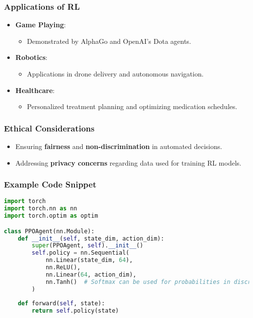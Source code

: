 \documentclass[aspectratio=169]{beamer}
\begin{document}
\begin{frame}
    \frametitle{Applications of RL}
    \begin{itemize}
        \item \textbf{Game Playing}:
        \begin{itemize}
            \item Demonstrated by AlphaGo and OpenAI's Dota agents.
        \end{itemize}
        
        \item \textbf{Robotics}:
        \begin{itemize}
            \item Applications in drone delivery and autonomous navigation.
        \end{itemize}
        
        \item \textbf{Healthcare}:
        \begin{itemize}
            \item Personalized treatment planning and optimizing medication schedules.
        \end{itemize}
    \end{itemize}
\end{frame}

\begin{frame}[fragile]
    \frametitle{Ethical Considerations}
    \begin{itemize}
        \item Ensuring \textbf{fairness} and \textbf{non-discrimination} in automated decisions.
        \item Addressing \textbf{privacy concerns} regarding data used for training RL models.
    \end{itemize}
\end{frame}

\begin{frame}[fragile]
    \frametitle{Example Code Snippet}
    \begin{lstlisting}[language=Python]
import torch
import torch.nn as nn
import torch.optim as optim

class PPOAgent(nn.Module):
    def __init__(self, state_dim, action_dim):
        super(PPOAgent, self).__init__()
        self.policy = nn.Sequential(
            nn.Linear(state_dim, 64),
            nn.ReLU(),
            nn.Linear(64, action_dim),
            nn.Tanh()  # Softmax can be used for probabilities in discrete action spaces
        )
        
    def forward(self, state):
        return self.policy(state)
    \end{lstlisting}
\end{frame}
\end{document}
